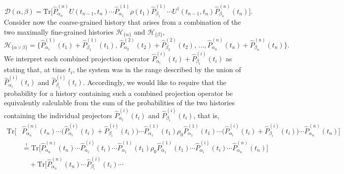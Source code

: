 \documentclass[rmp,aps,amsmath,amsfonts,noshowkeys,noshowpacs,12pt]{revtex4}
\begin{document}
\begin{widetext}

\begin{equation} \label{eq:dfs}
\mathcal{D}(\alpha,\beta) = \text{Tr} \big[
\widehat{P}^{(n)}_{\alpha_n} U(t_{n-1},t_n) 
 \cdots \widehat{P}^{(1)}_{\alpha_{1}}  \rho(t_1) 
\widehat{P}^{(1)}_{\beta_{1}} \cdots
U^\dagger(t_{n-1},t_n) \widehat{P}^{(n)}_{\beta_{n}}(t_n) \big].
\end{equation}
%
Consider now the coarse-grained history that arises from a combination
of the two maximally fine-grained histories $\mathcal{H}_{\{\alpha\}}$
and $\mathcal{H}_{\{\beta\}}$,
%
\begin{equation} \label{eq:hist-combined}
\mathcal{H}_{\{\alpha \lor \beta\}} = \{
\widehat{P}^{(1)}_{\alpha_1}(t_1)+ \widehat{P}^{(1)}_{\beta_1}(t_1),\,
\widehat{P}^{(2)}_{\alpha_2}(t_2) + \widehat{P}^{(2)}_{\beta_2}(t_2),\,
\dots,  \widehat{P}^{(n)}_{\alpha_n}(t_n) +
\widehat{P}^{(n)}_{\beta_n}(t_n) \}.   
\end{equation}
%
We interpret each combined projection operator
$\widehat{P}^{(i)}_{\alpha_i}(t_i)+ \widehat{P}^{(i)}_{\beta_i}(t_i)$
as stating that, at time $t_i$, the system was in the range described
by the union of $\widehat{P}^{(i)}_{\alpha_i}(t_i)$ and
$\widehat{P}^{(i)}_{\beta_i}(t_i)$. Accordingly, we would like to
require that the probability for a history containing such a combined
projection operator be equivalently calculable from the sum of the
probabilities of the two histories containing the individual
projectors $\widehat{P}^{(i)}_{\alpha_i}(t_i)$ and
$\widehat{P}^{(i)}_{\beta_i}(t_i)$, that is,
%
\begin{equation}
\begin{split}
%
\text{Tr} \big[ &
\widehat{P}^{(n)}_{\alpha_n}(t_n) 
\cdots \bigl(\widehat{P}^{(i)}_{\alpha_i}(t_i)+
\widehat{P}^{(i)}_{\beta_i}(t_i)\bigr) \cdots 
\widehat{P}^{(1)}_{\alpha_1}(t_1) \rho_0 \nonumber 
\widehat{P}^{(1)}_{\alpha_1}(t_1) \cdots \bigl(\widehat{P}^{(i)}_{\alpha_i}(t_i)+
\widehat{P}^{(i)}_{\beta_i}(t_i)\bigr) \cdots
\widehat{P}^{(n)}_{\alpha_n}(t_n) \big] \nonumber \\ &\stackrel{!}{=}
\text{Tr} \big[
\widehat{P}^{(n)}_{\alpha_n}(t_n) 
\cdots \widehat{P}^{(i)}_{\alpha_i}(t_i) \cdots 
\widehat{P}^{(1)}_{\alpha_1}(t_1) \rho_0\nonumber 
\widehat{P}^{(1)}_{\alpha_1}(t_1) \cdots \widehat{P}^{(i)}_{\alpha_i}(t_i) \cdots
\widehat{P}^{(n)}_{\alpha_n}(t_n)  \big] \nonumber \\ &\quad +
\text{Tr} \big[
\widehat{P}^{(n)}_{\alpha_n}(t_n) 
\cdots \widehat{P}^{(i)}_{\beta_i}(t_i) \cdots 

\end{split}
\end{equation}
\end{widetext}
\end{document}
